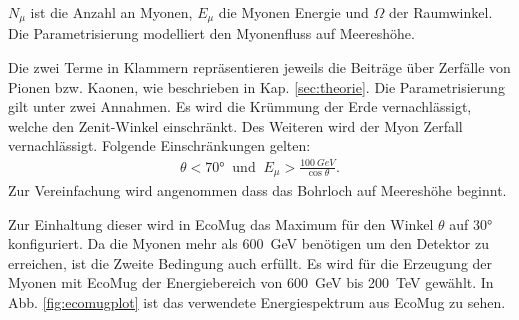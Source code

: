         

    
$N_{\mu}$ ist die Anzahl an Myonen, $E_{\mu}$ die Myonen Energie 
und $\Omega$ der Raumwinkel. Die Parametrisierung modelliert den Myonenfluss auf Meereshöhe.

Die zwei Terme in Klammern repräsentieren
jeweils die Beiträge über Zerfälle von Pionen bzw. Kaonen, wie beschrieben in Kap. \ref{sec:theorie}.
Die Parametrisierung gilt unter zwei Annahmen. Es wird die Krümmung der Erde vernachlässigt, 
welche den Zenit-Winkel einschränkt. Des Weiteren wird der Myon Zerfall vernachlässigt.
Folgende Einschränkungen gelten:
\begin{align}
    \theta < 70° \;\; \mathrm{und} \;\; E_\mu > \frac{\SI[]{100}[]{GeV}}{\cos \theta}.
\end{align}
Zur Vereinfachung wird angenommen dass das Bohrloch auf Meereshöhe beginnt. 

Zur Einhaltung dieser wird in EcoMug das Maximum für den Winkel $\theta$ auf $30°$ konfiguriert.
Da die Myonen mehr als \SI[]{600}[]{GeV} benötigen um den Detektor zu erreichen,
ist die Zweite Bedingung auch erfüllt.
Es wird für die Erzeugung der Myonen mit EcoMug der Energiebereich von \SI[]{600}[]{GeV} bis 
\SI[]{200}[]{TeV} gewählt.
In Abb. \ref{fig:ecomugplot} ist das verwendete Energiespektrum aus EcoMug zu sehen.

